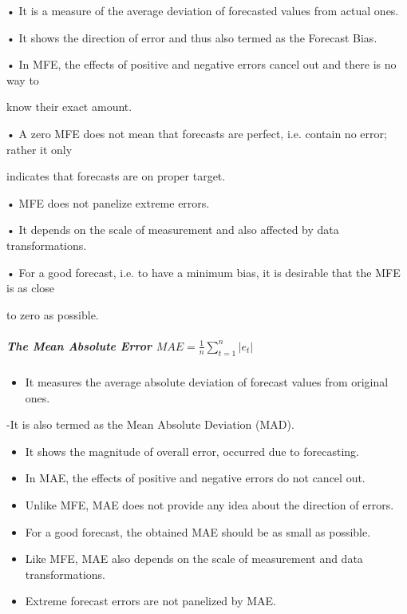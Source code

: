 \documentclass[
  onepage,
  openany]{scrbook}
\let\oldsubparagraph\subparagraph
\renewcommand{\subparagraph}[1]{\oldsubparagraph{#1}\mbox{}}
\providecommand{\tightlist}{%
  \setlength{\itemsep}{0pt}\setlength{\parskip}{0pt}}\usepackage{longtable,booktabs,array}
\begin{document}
• It is a measure of the average deviation of forecasted values from
actual ones.

• It shows the direction of error and thus also termed as the Forecast
Bias.

• In MFE, the effects of positive and negative errors cancel out and
there is no way to

know their exact amount.

• A zero MFE does not mean that forecasts are perfect, i.e. contain no
error; rather it only

indicates that forecasts are on proper target.

• MFE does not panelize extreme errors.

• It depends on the scale of measurement and also affected by data
transformations.

• For a good forecast, i.e. to have a minimum bias, it is desirable that
the MFE is as close

to zero as possible.

\hypertarget{the-mean-absolute-error-displaystyle-mae-frac1nsum_t1ne_t}{%
\subparagraph{\texorpdfstring{The Mean Absolute Error
\(\displaystyle MAE = \frac{1}{n}\sum_{t=1}^{n}|e_{t}|\)}{The Mean Absolute Error \textbackslash displaystyle MAE = \textbackslash frac\{1\}\{n\}\textbackslash sum\_\{t=1\}\^{}\{n\}\textbar e\_\{t\}\textbar{}}}\label{the-mean-absolute-error-displaystyle-mae-frac1nsum_t1ne_t}}

\begin{itemize}
\tightlist
\item
  It measures the average absolute deviation of forecast values from
  original ones.
\end{itemize}

-It is also termed as the Mean Absolute Deviation (MAD).

\begin{itemize}
\item
  It shows the magnitude of overall error, occurred due to forecasting.
\item
  In MAE, the effects of positive and negative errors do not cancel out.
\item
  Unlike MFE, MAE does not provide any idea about the direction of
  errors.
\item
  For a good forecast, the obtained MAE should be as small as possible.
\item
  Like MFE, MAE also depends on the scale of measurement and data
  transformations.
\item
  Extreme forecast errors are not panelized by MAE.
\end{itemize}
\end{document}
